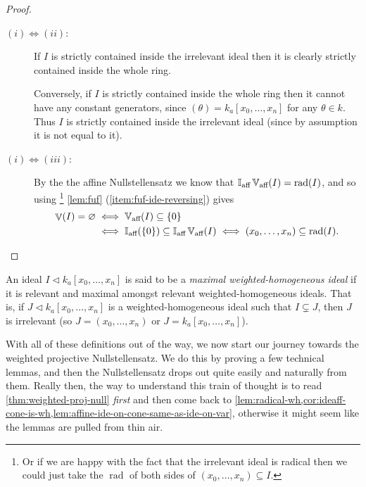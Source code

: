 \documentclass[10pt,notitlepage]{article}
\numberwithin{equation}{subsection}
\DeclareMathOperator{\van}{\mathbb{V}}
\DeclareMathOperator{\rad}{rad}
\DeclareMathOperator{\vanaff}{\mathbb{V}_{\textnormal{aff}}}
\DeclareMathOperator{\ideaff}{\mathbb{I}_{\textnormal{aff}}}
\newcommand{\kazn}{k_a[x_0,\ldots,x_n]}
\newcommand{\zi}{\{0\}}
\begin{document}
    \begin{proof}
        \begin{description}
            \item[$(i)\iff(ii)$:] If $I$ is strictly contained inside the irrelevant ideal then it is clearly strictly contained inside the whole ring.

            Conversely, if $I$ is strictly contained inside the whole ring then it cannot have any constant generators, since $(\theta)=\kazn$ for any $\theta\in k$.
            Thus $I$ is strictly contained inside the irrelevant ideal (since by assumption it is not equal to it).
            \item[$(i)\iff(iii)$:] By the the affine Nullstellensatz we know that $\ideaff\vanaff(I)=\rad(I)$, and so using \footnote{%
                Or if we are happy with the fact that the irrelevant ideal is radical then we could just take the $\rad$ of both sides of $(x_0,\ldots,x_n)\subseteq I$.
            } \cref{lem:fuf} (\ref{item:fuf-ide-reversing}) gives
            \begin{align*}
                \van(I)=\varnothing &\iff \vanaff(I)\subseteq\zi \\&\iff \ideaff(\zi)\subseteq\ideaff\vanaff(I) \iff (x_0,\ldots,x_n)\subseteq\rad(I).\qedhere
            \end{align*}
        \end{description}
    \end{proof}

    \begin{definition}\label{defn:max-wh-ideals}
        An ideal $I\triangleleft\kazn$ is said to be a \emph{maximal weighted-homogeneous ideal} if it is relevant and maximal amongst relevant weighted-homogeneous ideals.
        That is, if $J\triangleleft\kazn$ is a weighted-homogeneous ideal such that $I\subsetneq J$, then $J$ is irrelevant (so $J=(x_0,\ldots,x_n)$ or $J=\kazn$).
    \end{definition}

    With all of these definitions out of the way, we now start our journey towards the weighted projective Nullstellensatz.
    We do this by proving a few technical lemmas, and then the Nullstellensatz drops out quite easily and naturally from them.
    Really then, the way to understand this train of thought is to read \cref{thm:weighted-proj-null} \emph{first} and then come back to \cref{lem:radical-wh,cor:ideaff-cone-is-wh,lem:affine-ide-on-cone-same-as-ide-on-var}, otherwise it might seem like the lemmas are pulled from thin air.
\end{document}
